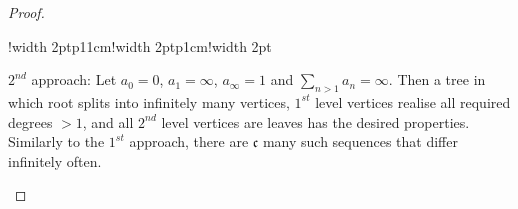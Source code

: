 \documentclass{amsart}
\theoremstyle{plain}
\theoremstyle{definition}
\theoremstyle{remark}
\numberwithin{equation}{section}
\newcommand{\cc}{\mathfrak{c}}
\begin{document}
\begin{proof}
\begin{center}
\begin{tabular}{!{\color{white}\vrule width 2pt}p{11cm}!{\color{white}\vrule width 2pt}p{1cm}!{\color{white}\vrule width 2pt}}
\vspace{5pt}

$2^{nd}$ approach: Let $a_0=0$, $a_1=\infty$, $a_\infty=1$ and $\sum\limits_{n>1} a_n=\infty$. Then a tree in which root splits into infinitely many vertices, $1^{st}$ level vertices realise all required degrees $>1$, and all $2^{nd}$ level vertices are leaves has the desired properties.  Similarly to the $1^{st}$ approach, there are $\cc$ many such sequences that differ infinitely often. 
\begin{center}


\begin{tikzpicture}[x=0.75pt,y=0.75pt,yscale=-1,xscale=1]


\end{tikzpicture}
\end{center}
\end{tabular}
\end{center}
\end{proof}
\end{document}
